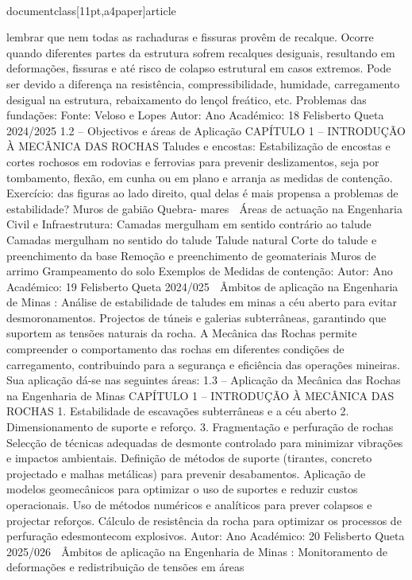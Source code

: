 \\documentclass[11pt,a4paper]{article}
\begin{document}
lembrar que nem todas as rachaduras e 
fissuras provêm de recalque.
Ocorre quando diferentes partes da 
estrutura sofrem recalques desiguais, 
resultando em deformações, fissuras e 
até risco de colapso estrutural em 
casos extremos. Pode ser devido a 
diferença na resistência, 
compressibilidade, humidade, 
carregamento desigual na estrutura, 
rebaixamento do lençol freático, etc. 
Problemas das fundações:
Fonte: Veloso 
e Lopes
Autor:
Ano Académico:
18
Felisberto Queta
2024/2025
1.2 – Objectivos e áreas de Aplicação
CAPÍTULO 1 
–
 INTRODUÇÃO À MECÂNICA DAS ROCHAS
Taludes e encostas:
Estabilização de encostas e cortes rochosos em rodovias e ferrovias para prevenir
deslizamentos, seja por tombamento, flexão, em cunha ou em plano e arranja as medidas de
contenção.
Exercício: das figuras ao lado direito,
qual delas é mais propensa a problemas
de estabilidade?
Muros
de
gabião
Quebra-
mares
 Áreas de actuação na Engenharia Civil e Infraestrutura:
Camadas mergulham em
sentido contrário ao talude
Camadas mergulham no
sentido do talude
Talude natural
Corte do talude e
preenchimento da base
Remoção e preenchimento
de geomateriais
Muros
de
arrimo
Grampeamento
do solo
Exemplos de
Medidas de
contenção:
Autor:
Ano Académico:
19
Felisberto Queta
2024/025

 Âmbitos de aplicação na Engenharia de Minas
:
Análise de estabilidade de taludes em minas a céu aberto para evitar
desmoronamentos.
Projectos de túneis e galerias subterrâneas, garantindo que suportem as 
tensões naturais da rocha.
A Mecânica das Rochas permite compreender o comportamento das rochas em diferentes condições de carregamento, 
contribuindo para a segurança e eficiência das operações mineiras. Sua aplicação dá-se nas seguintes áreas:
1.3 – Aplicação da Mecânica das Rochas na Engenharia de Minas
CAPÍTULO 1 
–
 INTRODUÇÃO À MECÂNICA DAS ROCHAS
1. Estabilidade de escavações subterrâneas e 
a céu aberto
2. Dimensionamento de suporte e reforço.
3. Fragmentação e perfuração de rochas Selecção de técnicas adequadas de desmonte controlado para minimizar 
vibrações e impactos ambientais.
Definição de métodos de suporte (tirantes, concreto projectado e malhas
metálicas) para prevenir desabamentos.
Aplicação de modelos geomecânicos para optimizar o uso de suportes e 
reduzir custos operacionais.
Uso de métodos numéricos e analíticos para prever colapsos e projectar
reforços.
Cálculo de resistência da rocha para optimizar os processos de 
perfuração edesmontecom explosivos.
Autor:
Ano Académico:
20
Felisberto Queta
2025/026

 Âmbitos de aplicação na Engenharia de Minas
:
Monitoramento de deformações e redistribuição de tensões em áreas 
\end{document}
